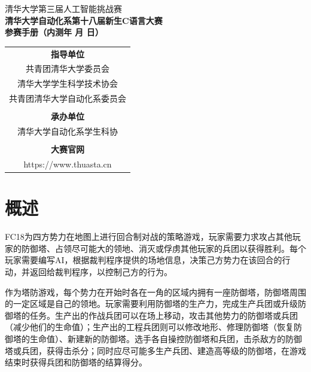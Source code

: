 \documentclass[a4paper,4pt]{article}
\renewcommand{\today}{\number\year 年 \number\month 月 \number\day 日}
\begin{document}
\begin{titlepage}
  \heiti
  \vspace*{20pt}
  \begin{center}
    \fontsize{20pt}{0} {清华大学第三届人工智能挑战赛}\\
    \vspace*{20pt}
    \fontsize{20pt}{0} \textbf{清华大学自动化系第十八届新生C语言大赛}\\
    \vspace*{20pt}
    \fontsize{20pt}{0} \textbf{参赛手册（内测\today）}\\
    \vspace*{280pt}
    \normalsize
    \rmfamily
    \begin{tabular}{c} %
      \textbf{指导单位}            \\
      共青团清华大学委员会         \\
      清华大学学生科学技术协会     \\
      共青团清华大学自动化系委员会 \\
      \\
      \textbf{承办单位}            \\
      清华大学自动化系学生科协     \\
      \\
      \textbf{大赛官网}            \\
      https://www.thuasta.cn       \\
    \end{tabular}
  \end{center}
\end{titlepage}


\tableofcontents%
\newpage%
\section{概述}
FC18为四方势力在地图上进行回合制对战的策略游戏，玩家需要力求攻占其他玩家的防御塔、占领尽可能大的领地、消灭或俘虏其他玩家的兵团以获得胜利。每个玩家需要编写AI，根据裁判程序提供的场地信息，决策己方势力在该回合的行动，并返回给裁判程序，以控制己方的行为。\par
作为塔防游戏，每个势力在开始时各在一角的区域内拥有一座防御塔，防御塔周围的一定区域是自己的领地。玩家需要利用防御塔的生产力，完成生产兵团或升级防御塔的任务。生产出的作战兵团可以在场上移动，攻击其他势力的防御塔或兵团（减少他们的生命值）；生产出的工程兵团则可以修改地形、修理防御塔（恢复防御塔的生命值）、新建新的防御塔。选手各自操控防御塔和兵团，击杀敌方的防御塔或兵团，获得击杀分；同时应尽可能多生产兵团、建造高等级的防御塔，在游戏结束时获得兵团和防御塔的结算得分。
\end{document}

